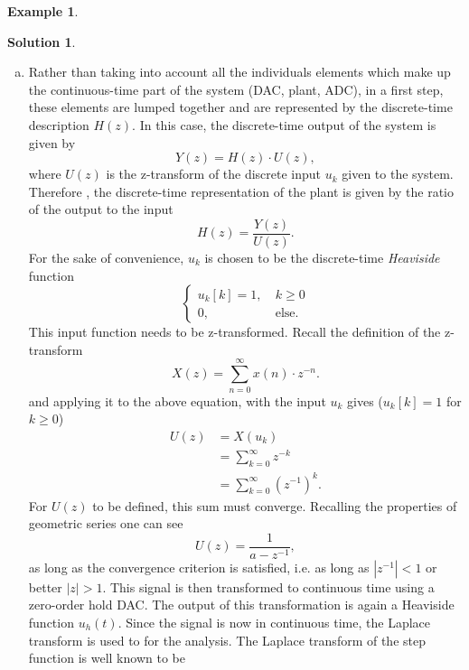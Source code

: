 \documentclass[a4paper,12 pt]{article}
\numberwithin{equation}{section}
\theoremstyle{definition}
\newtheorem{bsp}{Example}
\theoremstyle{remark}
\theoremstyle{definition}
\newtheorem*{lsg}{Solution}
\theoremstyle{definition}
\theoremstyle{definition}
\theoremstyle{remark}
\begin{document}
\begin{bsp}
\newpage
\begin{lsg}
\
\begin{enumerate}[(a)]
\item Rather than taking into account all the individuals elements which make up the continuous-time part of the system (DAC, plant, ADC), in a first step, these elements are lumped together and are represented by the discrete-time description $H(z)$. In this case, the discrete-time output of the system is given by
\begin{equation*}
Y(z)=H(z)\cdot U(z),
\end{equation*}
where $U(z)$ is the z-transform of the discrete input $u_k$ given to the system. Therefore , the discrete-time representation of the plant is given by the ratio of the output to the input
\begin{equation*}
H(z)=\frac{Y(z)}{U(z)}.
\end{equation*}
For the sake of convenience, $u_k$ is chosen to be the discrete-time \textit{Heaviside} function 
\begin{equation*}
\begin{cases}
u_k[k]=1, \ &k\geq 0\\
0,  \ &\text{else}.
\end{cases}
\end{equation*}
This input function needs to be z-transformed. Recall the definition of the z-transform 
\begin{equation*}
X(z)=\sum_{n=0}^\infty x(n)\cdot z^{-n}.
\end{equation*}
and applying it to the above equation, with the input $u_k$ gives ($u_k[k]=1$ for $k\geq 0$)
\begin{equation*}
\begin{split}
U(z)&=X(u_k)\\
&=\sum_{k=0}^\infty z^{-k}\\
&=\sum_{k=0}^\infty (z^{-1})^k.
\end{split}
\end{equation*}
For $U(z)$ to be defined, this sum must converge. Recalling the properties of geometric series one can see
\begin{equation*}
U(z)=\frac{1}{a-z^{-1}},
\end{equation*}
as long as the convergence criterion is satisfied, i.e. as long as $|z^{-1}|<1$ or better $|z|>1$. This signal is then transformed to continuous time using a zero-order hold DAC. The output of this transformation is again a Heaviside function $u_h(t)$. Since the signal is now in continuous time, the Laplace transform is used to for the analysis. The Laplace transform of the step function is well known to be

\end{enumerate}
\end{lsg}
\end{bsp}
\end{document}
